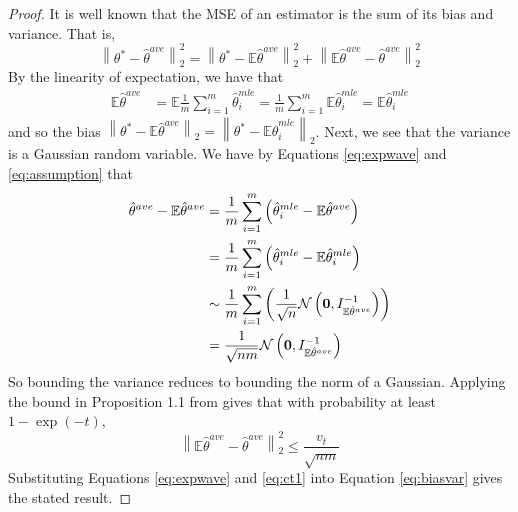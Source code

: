 \documentclass[twoside]{article}
\DeclareMathOperator*{\tr}{tr}
\newcommand{\zero}{\text{\textbf{0}}}
\newcommand{\E}{\mathbb{E}}
\newcommand{\w}{\theta}
\newcommand{\wave}{\hat\w^{ave}}
\newcommand{\wtave}{\hat\w^{ave,*}}
\newcommand{\wmle}{\hat\w^{mle}}
\newcommand{\wstar}{{\w^{*}}}
\newcommand{\I}{I}
\newcommand{\normal}[2]{\ensuremath{\mathcal{N}\left({{#1}},{{#2}}\right)}}
\newcommand{\ltwo}[1]{{\left\lVert {#1} \right\rVert}_2}
\begin{document}
\begin{proof}
It is well known that the MSE of an estimator is the sum of its bias and variance.
That is,
\begin{equation}
\ltwo{\wstar-\wave}^2 = \ltwo{\wstar-\E\wave}^2 + \ltwo{\E\wave-\wave}^2
\label{eq:biasvar}
\end{equation}
By the linearity of expectation, we have that
\begin{align}
\E\wave
&=
\E\frac{1}{m}\sum_{i=1}^m\wmle_i
=
\frac{1}{m}\sum_{i=1}^m\E\wmle_i
=
\E\wmle_i
\label{eq:expwave}
\end{align}
and so the bias
$\ltwo{\wstar-\E\wave}
=
\ltwo{\wstar-\E\wmle_i}
$.
Next, we see that the variance is a Gaussian random variable.
We have by Equations \ref{eq:expwave} and \ref{eq:assumption} that
\begin{align}
\wave-\E\wave
&=
\frac{1}{m}\sum_{i=1}^m\left(\wmle_i-\E\wave\right)
\\&=
\frac{1}{m}\sum_{i=1}^m\left(\wmle_i-\E\wmle_i\right)
\\&\sim
\frac{1}{m}\sum_{i=1}^m\left(\frac{1}{\sqrt n}\normal\zero{I^{-1}_{\E\wave}}\right)
\\&=
\frac{1}{\sqrt {nm}}\normal\zero{I^{-1}_{\E\wave}}
\end{align}
So bounding the variance reduces to bounding the norm of a Gaussian.
Applying the bound in Proposition 1.1 from \cite{hsu2012tail} gives that with probability at least $1-\exp(-t)$,
\begin{equation}
\ltwo{\E\wave-\wave}^2 \le \frac{v_t}{\sqrt{nm}}
\label{eq:ct1}
\end{equation}
Substituting Equations \ref{eq:expwave} and \ref{eq:ct1} into Equation \ref{eq:biasvar} gives the stated result.

\end{proof}
\end{document}
